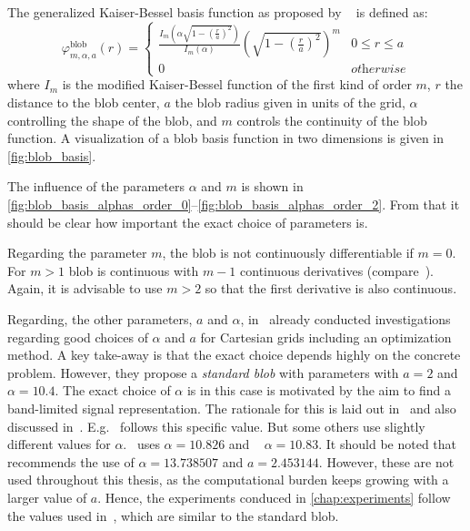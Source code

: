 \begin{definition}\label{def:blob_basis_fn}
	The generalized Kaiser-Bessel basis function as proposed by
	\citeauthor{lewitt_multidimensional_1990}~\cite{lewitt_multidimensional_1990,
		lewitt_alternatives_1992} is defined as:
	\[
		\varphi^{\text{blob}}_{m, \alpha, a}(r) =
		\begin{cases}
			\frac{I_m\left( \alpha \sqrt{1 - \left(\frac{r}{a}\right)^2} \right)} {I_m\left( \alpha \right)} \left( \sqrt{1 - \left(\frac{r}{a}\right)^2}\right)^m & 0 \le r \le a      \\
			0                                                                                                                                                      & \textit{otherwise}
		\end{cases}
	\]
	where \(I_m\) is the modified Kaiser-Bessel function of the first kind of order \(m\), \(r\) the
	distance to the blob center, \(a\) the blob radius given in units of the grid, \(\alpha\)
	controlling the shape of the blob, and \(m\) controls the continuity of the blob function. A
	visualization of a blob basis function in two dimensions is given in \autoref{fig:blob_basis}.
\end{definition}

The influence of the parameters \(\alpha\) and \(m\) is shown in
\autoref{fig:blob_basis_alphas_order_0}--\autoref{fig:blob_basis_alphas_order_2}. From that it
should be clear how important the exact choice of parameters is.

Regarding the parameter \(m\), the blob is not continuously differentiable if \(m = 0\). For \(m >
1\) blob is continuous with \(m - 1\) continuous derivatives (compare~\cite{matej_practical_1996}).
Again, it is advisable to use \(m > 2\) so that the first derivative is also continuous.

Regarding, the other parameters, \(a\) and \(\alpha\), \citeauthor{matej_practical_1996}
in~\cite{matej_practical_1996} already conducted investigations regarding good choices of \(\alpha\)
and \(a\) for Cartesian grids including an optimization method. A key take-away is that the exact
choice depends highly on the concrete problem. However, they propose a \textit{standard blob} with
parameters with \(a = 2\) and \(\alpha = 10.4\). The exact choice of \(\alpha\) is in this case is
motivated by the aim to find a band-limited signal representation. The rationale for this is laid
out in~\cite{lewitt_multidimensional_1990} and also discussed in~\cite{benkarroum_blob_2015}.
E.g.~\cite{xu_investigation_2012} follows this specific value. But some others use slightly
different values for \(\alpha\).~\cite{kohler_iterative_2011} uses \(\alpha = 10.826\) and
~\cite{levakhina_three-dimensional_2014} \(\alpha = 10.83\). It should be noted
that~\cite{benkarroum_blob_2015} recommends the use of \(\alpha = 13.738507\) and \(a = 2.453144\).
However, these are not used throughout this thesis, as the computational burden keeps growing with a
larger value of \(a\). Hence, the experiments conduced in \autoref{chap:experiments} follow the
values used in~\cite{levakhina_three-dimensional_2014}, which are similar to the standard blob.

